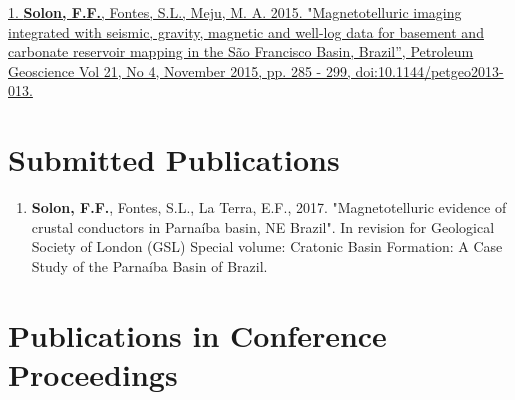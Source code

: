 \documentclass[10pt,a4paper,sans]{moderncv} %
\begin{document}

\begin{enumerate}

\href{http://pg.lyellcollection.org/content/early/2015/07/28/petgeo2013-013}{1. \textbf{Solon, F.F.}, Fontes, S.L., Meju, M. A. 2015. "Magnetotelluric imaging integrated with seismic, gravity, magnetic and well-log data for basement and carbonate reservoir mapping in the S\~{a}o Francisco Basin, Brazil'', Petroleum Geoscience Vol 21, No 4, November 2015, pp. 285 - 299, doi:10.1144/petgeo2013-013.}\\

\end{enumerate}


\section{Submitted Publications}

\begin{enumerate}


\item \textbf{Solon, F.F.}, Fontes, S.L., La Terra, E.F., 2017. "Magnetotelluric evidence of crustal conductors in Parna\'{i}ba basin, NE Brazil". In revision for Geological Society of London (GSL) Special volume: Cratonic Basin Formation: A Case Study of the Parna\'{i}ba Basin of Brazil.\\


\end{enumerate}


\section{Publications in Conference Proceedings}
\end{document}
